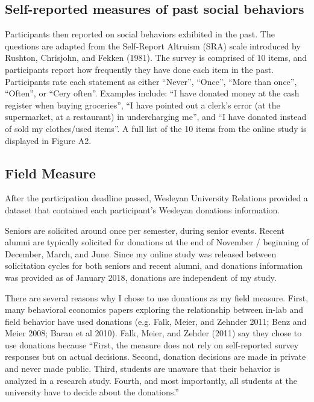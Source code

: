 \documentclass[12pt]{article}
\begin{document}
\subsection{Self-reported measures of past social behaviors}

Participants then reported on social behaviors exhibited in the past. The questions are adapted from the Self-Report Altruism (SRA) scale introduced by Rushton, Chrisjohn, and Fekken (1981). The survey is comprised of 10 items, and participants report how frequently they have done each item in the past. Participants rate each statement as either ``Never'', ``Once'', ``More than once'', ``Often'', or ``Cery often''. Examples include: ``I have donated money at the cash register when buying groceries'', ``I have pointed out a clerk\rq s error (at the supermarket, at a restaurant) in undercharging me'', and ``I have donated instead of sold my clothes/used items''. A full list of the 10 items from the online study is displayed in Figure A2. 

\subsection{Field Measure}

After the participation deadline passed, Wesleyan University Relations provided a dataset that contained each participant\rq s Wesleyan donations information.

Seniors are solicited around once per semester, during senior events. Recent alumni are typically solicited for donations at the end of November / beginning of December, March, and June. Since my online study was released between solicitation cycles for both seniors and recent alumni, and donations information was provided as of January 2018, donations are independent of my study. 

There are several reasons why I chose to use donations as my field measure. First, many behavioral economics papers exploring the relationship between in-lab and field behavior have used donations (e.g. Falk, Meier, and Zehnder 2011; Benz and Meier 2008; Baran et al 2010). Falk, Meier, and Zehder (2011) say they chose to use donations because {\color{blue}``First, the measure does not rely on self-reported survey responses but on actual decisions. Second, donation decisions are made in private and never made public. Third, students are unaware that their behavior is analyzed in a research study. Fourth, and most importantly, all students at the university have to decide about the donations.''}
\end{document}
